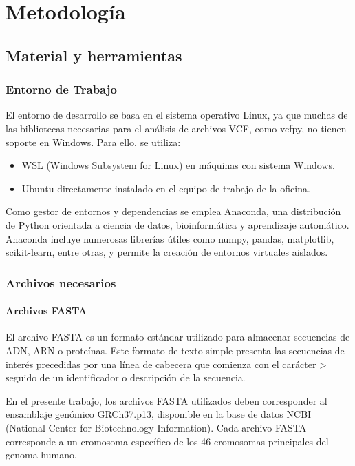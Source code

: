 \documentclass[11pt,spanish,listoffigures,listoftables]{tfgetsinf}
\begin{document}
\chapter{Metodología}


\section{Material y herramientas}

\subsection{Entorno de Trabajo}

El entorno de desarrollo se basa en el sistema operativo Linux, ya que muchas de las bibliotecas necesarias para el análisis de archivos VCF, como vcfpy, no tienen soporte en Windows. Para ello, se utiliza:
\begin{itemize}
   \item WSL (Windows Subsystem for Linux) en máquinas con sistema Windows.
   \item Ubuntu directamente instalado en el equipo de trabajo de la oficina.
\end{itemize}

Como gestor de entornos y dependencias se emplea Anaconda, una distribución de Python orientada a ciencia de datos, bioinformática y aprendizaje automático. Anaconda incluye numerosas librerías útiles como numpy, pandas, matplotlib, scikit-learn, entre otras, y permite la creación de entornos virtuales aislados.

\subsection{Archivos necesarios}

\subsubsection{Archivos FASTA}

El archivo FASTA es un formato estándar utilizado para almacenar secuencias de ADN, ARN o proteínas. Este formato de texto simple presenta las secuencias de interés precedidas por una línea de cabecera que comienza con el carácter > seguido de un identificador o descripción de la secuencia. 

En el presente trabajo, los archivos FASTA utilizados deben corresponder al ensamblaje genómico GRCh37.p13, disponible en la base de datos NCBI (National Center for Biotechnology Information). Cada archivo FASTA corresponde a un cromosoma específico de los 46 cromosomas principales del genoma humano. 
\end{document}

